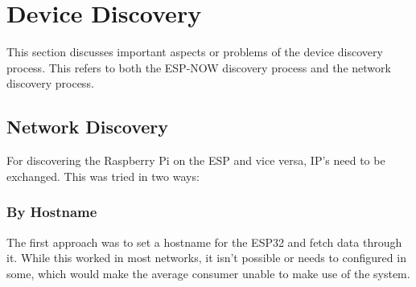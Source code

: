 \section{Device Discovery}
This section discusses important aspects or problems of the device discovery process.
This refers to both the ESP-NOW discovery process and the network discovery process.


    \subsection{Network Discovery}
    For discovering the Raspberry Pi on the ESP and vice versa,
    IP's need to be exchanged. This was tried in two ways:
        \subsubsection{By Hostname}
        The first approach was to set a hostname for the 
        ESP32 and fetch data through it. While this worked
        in most networks, it isn't possible or needs to 
        configured in some, which would make the average 
        consumer unable to make use of the system.


